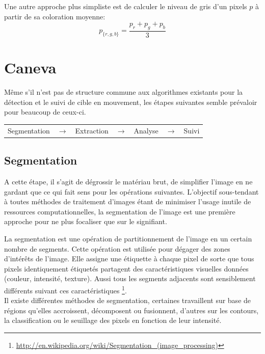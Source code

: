 \documentclass[a4paper,12pt]{report}
\begin{document}
Une autre approche plus simpliste est de calculer le niveau de gris d'un pixels $p$ à partir de sa coloration moyenne: \[p_{\{r,g,b\}} =\frac{p_r+p_g+p_b}{3}\]

\pagebreak
\section{Caneva}
Même s'il n'est pas de structure commune aux algorithmes existants pour la détection et le suivi de cible en mouvement, les étapes suivantes semble prévaloir pour beaucoup de ceux-ci.\\
\begin{center}
\begin{tabular}{ c c c c c c c } 
\cellcolor[gray]{0.9} Segmentation & $\rightarrow$ & \cellcolor[gray]{0.9} Extraction & $\rightarrow$ & \cellcolor[gray]{0.9} Analyse & $\rightarrow$ & \cellcolor[gray]{0.9} Suivi\\  
\end{tabular} 
\end{center}

\subsection{Segmentation}
A cette étape, il s'agit de dégrossir le matériau brut, de simplifier l'image en ne gardant que ce qui fait sens pour les opérations suivantes. L'objectif sous-tendant à toutes méthodes de traitement d'images étant de minimiser l'usage inutile de ressources computationnelles, la segmentation de l'image est une première approche pour ne plus focaliser que sur le signifiant. 

La segmentation est une opération de partitionnement de l'image en un certain nombre de segments. Cette opération est utilisée pour dégager des zones d'intérêts de l'image. Elle assigne une étiquette à chaque pixel de sorte que tous pixels identiquement étiquetés partagent des caractéristiques visuelles données (couleur, intensité, texture). Aussi tous les segments adjacents sont sensiblement différents suivant ces caractéristiques \footnote{\url{http://en.wikipedia.org/wiki/Segmentation_(image_processing)}}.\\

Il existe différentes méthodes de segmentation, certaines travaillent sur base de régions qu'elles accroissent, décomposent ou fusionnent, d'autres sur les contours, la classification ou le seuillage des pixels en fonction de leur intensité.\\
\end{document}
